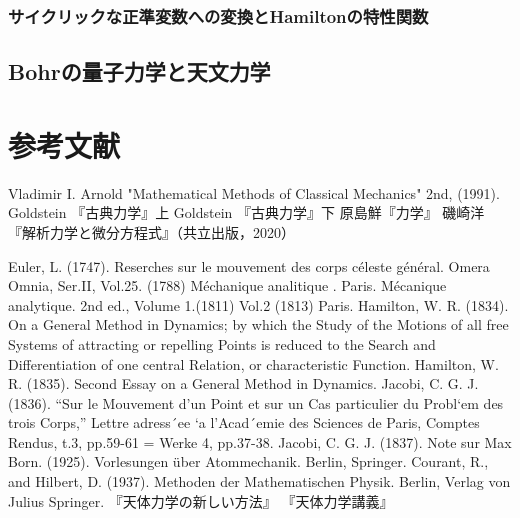 \documentclass[uplatex, dvipdfmx]{jsreport}
\begin{document}
\subsection{サイクリックな正準変数への変換とHamiltonの特性関数}

\section{Bohrの量子力学と天文力学}



\chapter{参考文献}

\begin{thebibliography}{99}
    Vladimir I. Arnold "Mathematical Methods of Classical Mechanics" 2nd, (1991).
    Goldstein 『古典力学』上
    Goldstein 『古典力学』下
    原島鮮『力学』
    磯崎洋『解析力学と微分方程式』（共立出版，2020）

    Euler, L. (1747). Reserches sur le mouvement des corps céleste général. Omera Omnia, Ser.II, Vol.25.
    (1788) Méchanique analitique . Paris.
    Mécanique analytique. 2nd ed., Volume 1.(1811) Vol.2 (1813) Paris.
    Hamilton, W. R. (1834). On a General Method in Dynamics; by which the Study of the Motions of all
    free Systems of attracting or repelling Points is reduced to the Search and Differentiation
    of one central Relation, or characteristic Function.
    Hamilton, W. R. (1835). Second Essay on a General Method in Dynamics.
    Jacobi, C. G. J. (1836).
    “Sur le Mouvement d’un Point et sur un Cas particulier du Probl`em des trois Corps,” Lettre adress´ee
`a l’Acad´emie des Sciences de Paris, Comptes Rendus, t.3, pp.59-61 = Werke 4, pp.37-38.
    Jacobi, C. G. J. (1837). Note sur
    Max Born. (1925). Vorlesungen über Atommechanik. Berlin, Springer.
    Courant, R., and Hilbert, D. (1937). Methoden der Mathematischen Physik. Berlin, Verlag von Julius Springer.
    『天体力学の新しい方法』
    『天体力学講義』
\end{thebibliography}
\end{document}
